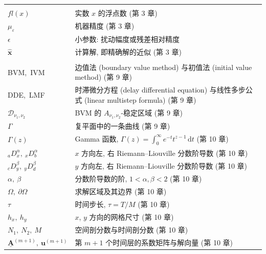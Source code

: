 \begin{longtable}{@{}>{\raggedright\arraybackslash}p{}>{\raggedright\arraybackslash}p{}@{}}
  \addlinespace[6pt]
  \multicolumn{2}{@{}l}{\headfont 八、误差与浮点运算} \\*[3pt]
  $fl(x)$ & 实数 $x$ 的浮点数 (第 3 章) \\
  $\mu_\varepsilon$ & 机器精度 (第 3 章) \\
  $\epsilon$ & 小参数: 扰动幅度或残差相对精度 \\
  $\hat{\mathbf{x}}$ & 计算解, 即精确解的近似 (第 3 章) \\

  \addlinespace[6pt]
  \multicolumn{2}{@{}l}{\headfont 九、常微分方程与分数阶扩散方程} \\*[3pt]
  BVM,\ IVM & 边值法 (boundary value method) 与初值法 (initial value method) (第 9 章) \\
  DDE,\ LMF & 时滞微分方程 (delay differential equation) 与线性多步公式 (linear multistep formula) (第 9 章) \\
  $\mathcal{D}_{\nu_1,\nu_2}$ & BVM 的 $A_{\nu_1,\nu_2}$-稳定区域 (第 9 章) \\
  $\Gamma$ & 复平面中的一条曲线 (第 9 章) \\
  $\Gamma(z)$ & Gamma 函数, $\Gamma(z)=\int_0^\infty e^{-t}t^{z-1}\,\mathrm{d}t$ (第 10 章) \\
  ${}_{a}D_x^{\alpha},\ {}_{x}D_b^{\alpha}$ & $x$ 方向左, 右 Riemann--Liouville 分数阶导数 (第 10 章) \\
  ${}_{c}D_y^{\beta},\ {}_{y}D_d^{\beta}$ & $y$ 方向左, 右 Riemann--Liouville 分数阶导数 (第 10 章) \\
  $\alpha,\ \beta$ & 分数阶导数的阶, $1<\alpha,\beta<2$ (第 10 章) \\
  $\Omega,\ \partial\Omega$ & 求解区域及其边界 (第 10 章) \\
  $\tau$ & 时间步长, $\tau=T/M$ (第 10 章) \\
  $h_x,\ h_y$ & $x$, $y$ 方向的网格尺寸 (第 10 章) \\
  $N_1,\ N_2,\ M$ & 空间剖分数与时间剖分数 (第 10 章) \\
  $\underline{\mathbf{A}}^{(m+1)},\ \mathbf{u}^{(m+1)}$ & 第 $m+1$ 个时间层的系数矩阵与解向量 (第 10 章) \\

\end{longtable}
\endgroup

